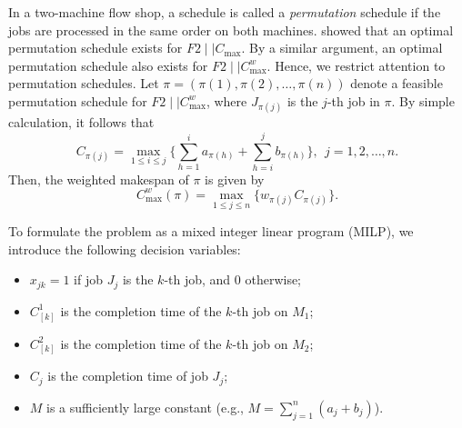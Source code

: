 \documentclass[12pt]{article}
\begin{document}
\begin{sloppypar}
        In a two-machine flow shop, a schedule is called a \textit{permutation} schedule if the jobs are processed in the same order on both machines. \cite{Johnson1954NRL} showed that an optimal permutation schedule exists for $F2 \mid \mid C_{\max}$. By a similar argument, an optimal permutation schedule also exists for $F2 \mid \mid C_{\max}^w$. Hence, we restrict  attention to permutation schedules. Let $\pi = (\pi(1), \pi(2), \ldots, \pi(n))$ denote a feasible permutation schedule for $F2 \mid \mid C_{\max}^w$, where $J_{\pi(j)}$ is the $j$-th job in $\pi$. By simple calculation, it follows that 
        \begin{equation}\label{eq:completion}
            C_{\pi(j)} = \max_{1 \leq i \leq j} \Big\{\sum_{h=1}^{i}a_{\pi(h)} + \sum_{h=i}^{j}b_{\pi(h)} \Big\}, ~~ j=1, 2, \ldots, n.
        \end{equation}
        Then, the weighted makespan of $\pi$ is given by 
        \begin{equation}\label{eq:wcmax}
            C_{\max}^w(\pi)=\max_{1 \leq j \leq n}\{ w_{\pi(j)} C_{\pi(j)}\}.
        \end{equation}
        
        To formulate the problem as a mixed integer linear program (MILP), we introduce the following decision variables:
        \begin{itemize}
            \item $x_{jk} = 1$ if job $J_j$ is the $k$-th job, and $0$ otherwise;
            
            \item $C_{[k]}^1$ is the completion time of the $k$-th job on $M_1$;
            
            \item $C_{[k]}^2$ is the completion time of the $k$-th job on $M_2$;
            
            \item $C_j$ is the completion time of job $J_j$;
            
            \item $M$ is a sufficiently large constant (e.g., $M=\sum_{j=1}^{n}(a_j + b_j)$).
        \end{itemize}
        

\end{sloppypar}
\end{document}
